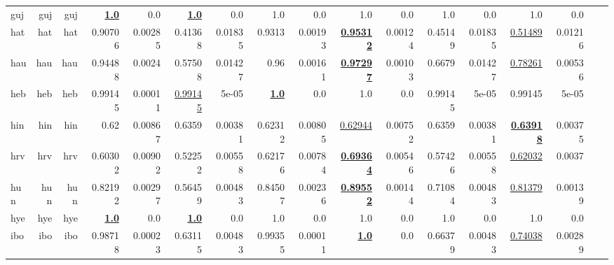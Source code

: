 \documentclass[11pt]{article}
\begin{document}
\begin{table*}[h]
{\begin{tabular}{lrrrrrrrrrrrrrrrr}
guj         & guj         & guj         & \textbf{\underline{1.0}}         & 0.0         & \textbf{\underline{1.0}}         & 0.0         & 1.0         & 0.0         & 1.0         & 0.0         & 1.0         & 0.0         & 1.0         & 0.0         \\
hat         & hat         & hat         & 0.90706         & 0.00285         & 0.41368         & 0.01835         & 0.9313         & 0.00193         & \textbf{\underline{0.95312}}         & 0.00124         & 0.45149         & 0.01835         & \underline{0.51489}         & 0.01216         \\
hau         & hau         & hau         & 0.94488         & 0.0024         & 0.57508         & 0.01427         & 0.96         & 0.00161         & \textbf{\underline{0.97297}}         & 0.00103         & 0.6679         & 0.01427         & \underline{0.78261}         & 0.00536         \\
heb         & heb         & heb         & 0.99145         & 0.00011         & \underline{0.99145}         & 5e-05         & \textbf{\underline{1.0}}         & 0.0         & 1.0         & 0.0         & 0.99145         & 5e-05         & 0.99145         & 5e-05         \\
hin         & hin         & hin         & 0.62         & 0.00867         & 0.6359         & 0.00381         & 0.62312         & 0.00805         & \underline{0.62944}         & 0.00752         & 0.6359         & 0.00381         & \textbf{\underline{0.63918}}         & 0.00375         \\
hrv         & hrv         & hrv         & 0.60302         & 0.00902         & 0.52252         & 0.00558         & 0.62176         & 0.00784         & \textbf{\underline{0.69364}}         & 0.00546         & 0.57426         & 0.00558         & \underline{0.62032}         & 0.0037         \\
hun         & hun         & hun         & 0.82192         & 0.00297         & 0.56459         & 0.00483         & 0.84507         & 0.00236         & \textbf{\underline{0.89552}}         & 0.00144         & 0.71084         & 0.00483         & \underline{0.81379}         & 0.00139         \\
hye         & hye         & hye         & \textbf{\underline{1.0}}         & 0.0         & \textbf{\underline{1.0}}         & 0.0         & 1.0         & 0.0         & 1.0         & 0.0         & 1.0         & 0.0         & 1.0         & 0.0         \\
ibo         & ibo         & ibo         & 0.98718         & 0.00023         & 0.63115         & 0.00483         & 0.99355         & 0.00011         & \textbf{\underline{1.0}}         & 0.0         & 0.66379         & 0.00483         & \underline{0.74038}         & 0.00289         \\

\end{tabular}}
\end{table*}
\end{document}

